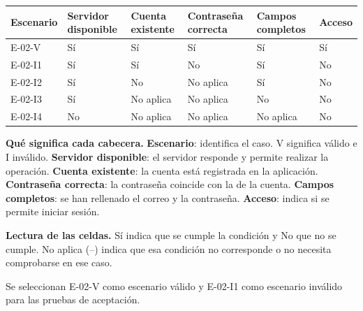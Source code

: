\begingroup\fontsize{7.8}{11}\selectfont\setlength{\tabcolsep}{3pt}
\begin{tabularx}{\linewidth}{@{}*{6}{Y}@{}}\toprule
\textbf{Escenario} & \textbf{Servidor disponible} & \textbf{Cuenta existente} & \textbf{Contraseña correcta} & \textbf{Campos completos} & \textbf{Acceso}\\\midrule
E-02-V & Sí & Sí & Sí & Sí & Sí\\[3pt]
E-02-I1 & Sí & Sí & No & Sí & No\\[3pt]
E-02-I2 & Sí & No & No aplica & Sí & No\\[3pt]
E-02-I3 & Sí & No aplica & No aplica & No & No\\[3pt]
E-02-I4 & No & No aplica & No aplica & No aplica & No\\[3pt]
\bottomrule\end{tabularx}\endgroup\par
{\fontsize{9}{11}\selectfont\textbf{Qué significa cada cabecera.} \textbf{Escenario}: identifica el caso. V significa válido e I inválido. \textbf{Servidor disponible}: el servidor responde y permite realizar la operación. \textbf{Cuenta existente}: la cuenta está registrada en la aplicación. \textbf{Contraseña correcta}: la contraseña coincide con la de la cuenta. \textbf{Campos completos}: se han rellenado el correo y la contraseña. \textbf{Acceso}: indica si se permite iniciar sesión.\par\textbf{Lectura de las celdas.} Sí indica que se cumple la condición y No que no se cumple. No aplica (--) indica que esa condición no corresponde o no necesita comprobarse en ese caso.\par}


Se seleccionan E-02-V como escenario válido y E-02-I1 como escenario inválido para las pruebas de aceptación.\par


